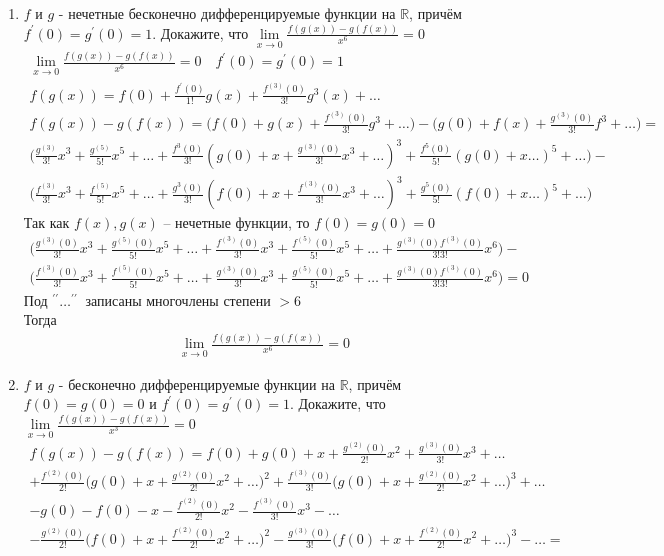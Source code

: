 		\begin{enumerate}
		\item $f$ и $g$ - нечетные бесконечно дифференцируемые функции на $\mathbb{R}$, причём $f^{\prime}(0) = g^{\prime}(0) = 1$. Докажите, что $\lim\limits_{x\to 0}\frac{f(g(x)) - g(f(x))}{x^6} = 0$
			\begin{gather*}
				\lim \limits_{x \to 0} \frac{f(g(x)) - g(f(x))}{x^6} = 0 \quad f^{\prime}(0) = g^{\prime}(0) = 1\\
				f(g(x)) = f(0) + \frac{f^{\prime}(0)}{1!}g(x) + \frac{f^{(3)}(0)}{3!}g^{3}(x) + \ldots\\
				f(g(x)) - g(f(x)) = \Big(f(0) + g(x) + \frac{f^{(3)}(0)}{3!}g^{3} + \ldots \Big) - \Big( g(0) + f(x) + \frac{g^{(3)}(0)}{3!}f^{3} + \ldots \Big) = \\
				\Big( \frac{g^{(3)}}{3!}x^3 + \frac{g^{(5)}}{5!}x^5 + \ldots + \frac{f^3(0)}{3!}(g(0) + x + \frac{g^{(3)}(0)}{3!}x^3 + \ldots)^3 + \frac{f^5(0)}{5!}(g(0) + x \ldots)^5 + \ldots \Big) - \\
				\Big( \frac{f^{(3)}}{3!}x^3 + \frac{f^{(5)}}{5!}x^5 + \ldots + \frac{g^3(0)}{3!}(f(0) + x + \frac{f^{(3)}(0)}{3!}x^3 + \ldots)^3 + \frac{g^5(0)}{5!}(f(0) + x \ldots)^5 + \ldots \Big)
			\end{gather*}
			Так как $f(x), g(x)$ -- нечетные функции, то $f(0) = g(0) = 0$
			\begin{gather*}
				\Big(
				\frac{g^{(3)}(0)}{3!}x^3 + \frac{g^{(5)}(0)}{5!}x^5 + \ldots
				 + \frac{f^{(3)}(0)}{3!}x^3 + \frac{f^{(5)}(0)}{5!}x^5 + \ldots
				 + \frac{g^{(3)}(0) f^{(3)}(0)}{3!3!}x^6 
				\Big)
				 - \\
				\Big(
				\frac{f^{(3)}(0)}{3!}x^3 + \frac{f^{(5)}(0)}{5!}x^5 + \ldots
				 + \frac{g^{(3)}(0)}{3!}x^3 + \frac{g^{(5)}(0)}{5!}x^5 + \ldots
				 + \frac{g^{(3)}(0) f^{(3)}(0)}{3!3!}x^6
				\Big)
				 = 0
			\end{gather*}
			Под $^{\prime \prime}\ldots^{\prime \prime}\ $ записаны многочлены степени $>6$\\
			Тогда
			\begin{gather*}
				\lim \limits_{x \to 0} \frac{f(g(x)) - g(f(x))}{x^6} = 0
			\end{gather*}
		\item $f$ и $g$ - бесконечно дифференцируемые функции на $\mathbb{R}$, причём $f(0) = g(0) = 0$ и $f^{\prime}(0) = g^{\prime}(0) = 1$. Докажите, что $\lim\limits_{x\to 0}\frac{f(g(x)) - g(f(x))}{x^3} = 0$
			\begin{gather*}
				f(g(x)) - g(f(x)) = f(0) + g(0) + x + \frac{g^{(2)}(0)}{2!}x^2 + \frac{g^{(3)}(0)}{3!}x^3 + \ldots\\ + \frac{f^{(2)}(0)}{2!} \Big( g(0) + x + \frac{g^{(2)}(0)}{2!}x^2 + \ldots \Big)^{2} + \frac{f^{(3)}(0)}{3!} \Big( g(0) + x + \frac{g^{(2)}(0)}{2!}x^2 + \ldots \Big)^{3} + \ldots\\ - g(0) - f(0) - x - \frac{f^{(2)}(0)}{2!} x^2 - \frac{f^{(3)}(0)}{3!} x^3 - \ldots\\ - \frac{g^{(2)}(0)}{2!} \Big( f(0) + x + \frac{f^{(2)}(0)}{2!}x^2 + \ldots \Big)^{2} - \frac{g^{(3)}(0)}{3!} \Big( f(0) + x + \frac{f^{(2)}(0)}{2!}x^2 + \ldots \Big)^{3} - \ldots = \\

\end{gather*}
\end{enumerate}
